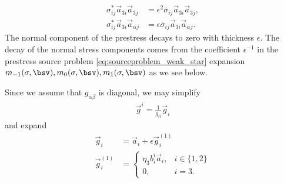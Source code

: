  \begin{align}\label{eq:normalstressdecay1}
     \sigma_{ij}^* \vec a_{3i}  \vec a_{3j} &= \epsilon^2 \bar \sigma_{ij} \vec a_{3i} \vec a_{3j}, \\
     \label{eq:normalstressdecay2}
    \sigma_{ij}^* \vec a_{3i}  \vec a_{\alpha j} &= \epsilon \bar \sigma_{ij} \vec a_{3i} \vec a_{\alpha j}.
 \end{align} The normal component of the prestress decays to zero with thickness $\epsilon$. The decay of the normal stress components comes from the coefficient $\epsilon^{-1}$ 
 in the prestress source problem \eqref{eq:sourceproblem_weak_star} expansion $m_{-1}(\sigma,\bsv), m_{0}(\sigma,\bsv), m_{1}(\sigma,\bsv)$ as we see below.
 
Since we assume that $g_{\alpha\beta}$ is diagonal, we may simplify 
 \begin{align}\label{eq:covariant_vec_expa}
     \vec g^i = \frac 1 {g_{ii}}  \vec g _{i}
 \end{align}
 and expand 
 \begin{align} \label{eq:expa_gi}
     \vec g_i &= \vec a_i + \epsilon \vec g_{i}^{(1)} \\ 
      \vec g_{i}^{(1)}& = \begin{cases}
          \eta_3 b^{i}_i \vec a_i, &  i \in \{ 1,2\}\\
          0, & i =3 .
      \end{cases} 
 \end{align}
